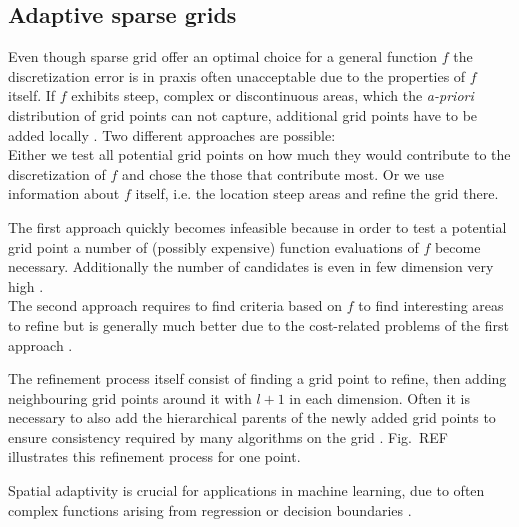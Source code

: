 \subsection{Adaptive sparse grids}

Even though sparse grid offer an optimal choice for a general function $f$
the discretization error is in praxis often unacceptable due to
the properties of $f$ itself. If $f$ exhibits steep, complex
or discontinuous areas, which the \emph{a-priori} distribution of grid points
can not capture, additional grid points have to be added locally
\cite{disspfl}.
Two different approaches are possible: \\
Either we test all potential grid points on how much they would contribute
to the discretization of $f$ and chose the those that contribute most.
Or we use information about $f$ itself, i.e. the location steep areas
and refine the grid there.
\par
The first approach quickly becomes infeasible because in order to test
a potential grid point a number of
(possibly expensive) function evaluations of $f$ become necessary. Additionally
the number of candidates is even in few dimension very high \cite{disspfl}. \\
The second approach requires to find criteria based on $f$ to
find interesting areas to refine but is generally much better due to the
cost-related problems of the first approach \cite{disspfl}.
\par
The refinement process itself consist of finding a grid point to refine,
then adding neighbouring grid points around it with $l + 1$ in each dimension.
Often it is necessary to also add the hierarchical parents of the newly added
grid points to ensure consistency required by many algorithms on the grid
\cite{disspfl}.
Fig.~REF illustrates this refinement process for one point.
\par
Spatial adaptivity is crucial for applications in machine learning, due to
often complex functions arising from regression or decision boundaries 
\cite{disspfl, artbunshort}.


